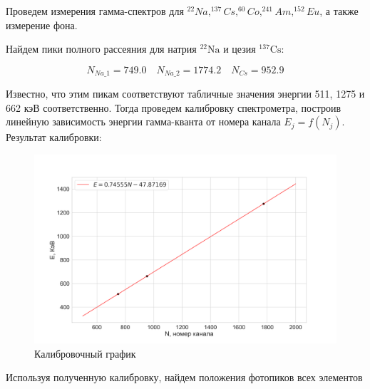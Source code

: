 \documentclass[a4paper, 12pt]{article}
\begin{document}
Проведем измерения гамма-спектров для $ ^{22}Na, ^{137}Cs, ^{60}Co, ^{241}Am, ^{152}Eu $, а также измерение фона.
	
	Найдем пики полного рассеяния для натрия $ \mathrm{^{22}Na} $ и цезия $ \mathrm{^{137}Cs} $:
	
	\begin{equation}\label{}
	N_{Na\_1} = 749.0 \quad N_{Na\_2} = 1774.2 \quad N_{Cs} = 952.9
	\end{equation}
	
	Известно, что этим пикам соответствуют табличные значения энергии 511, 1275 и 662 кэВ соответственно. Тогда проведем калибровку спектрометра, построив линейную зависимость энергии гамма-кванта от номера канала $ E_j = f(N_j) $. Результат калибровки:


\begin{figure}[H]
	\centering
	\includegraphics[width=1\textwidth]{plot_calib.png}  \caption{Калибровочный график}
	\label{fig:calib}
\end{figure}

Используя полученную калибровку, найдем положения фотопиков всех элементов
\end{document}
